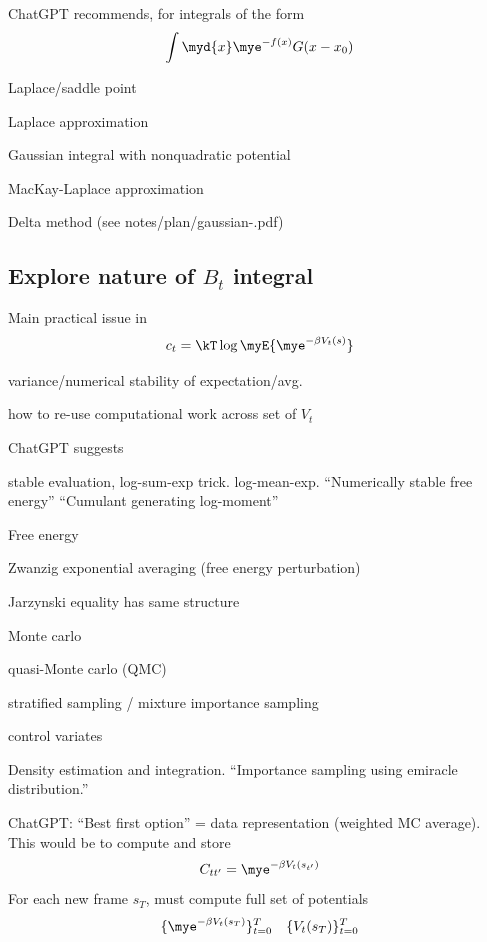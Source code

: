 ChatGPT recommends, for integrals of the form
\[
    \int\myd{x}\mye^{-f(x)}G(x-x_0)
\]
\begin{enumeratec}
    \item Laplace/saddle point
    \begin{itemizec}
        \item Laplace approximation
        \item Gaussian integral with nonquadratic potential
        \item MacKay-Laplace approximation
    \end{itemizec}
    \item Delta method (see notes/plan/gaussian-.pdf)
\end{enumeratec}

\subsection{Explore nature of $B_t$ integral}
Main practical issue in
\[
    c_t = \kT\log\myE{\mye^{-\beta V_t(s)}}
\]
\begin{enumeratec}
    \item variance/numerical stability of expectation/avg.
    \item how to re-use computational work across set of $V_t$
\end{enumeratec}
ChatGPT suggests
\begin{enumeratec}
    \item stable evaluation, log-sum-exp trick.  log-mean-exp.  ``Numerically stable free energy''  ``Cumulant generating log-moment''
    \item Free energy
    \begin{itemizec}
        \item Zwanzig exponential averaging (free energy perturbation)
        \item Jarzynski equality has same structure
    \end{itemizec}
    \item Monte carlo
    \begin{itemizec}
        \item quasi-Monte carlo (QMC)
        \item stratified sampling / mixture importance sampling
        \item control variates
    \end{itemizec}
    \item Density estimation and integration.  ``Importance sampling using emiracle distribution.''
\end{enumeratec}
ChatGPT: ``Best first option'' = data representation (weighted MC average).  This would be to compute and store
\[
    C_{tt'} = \mye^{-\beta V_t(s_{t'})}
\]
For each new frame $s_T$, must compute full set of potentials
\[
    \{\mye^{-\beta V_t(s_T)}\}_{t=0}^T \quad \{V_t(s_T)\}_{t=0}^T
\]

